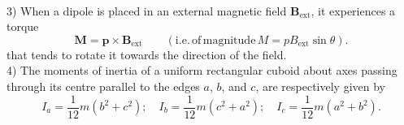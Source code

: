 \documentclass[../TST.tex]{subfiles}
\begin{document}
\begin{eproblem}{\ \\[5pt]}
3) When a dipole is placed in an external magnetic field $\mathbf{B_\mathrm{ext}}$, it experiences a torque
\begin{equation*}
	\mathbf{M}=\mathbf{p}\times\mathbf{B_\mathrm{ext}} \quad\quad (\mathrm{i.e.\,of\,magnitude}\,M=pB_\mathrm{ext}\sin{\theta})
.
\end{equation*}
that tends to rotate it towards the direction of the field.\\

4) The moments of inertia of a uniform rectangular cuboid about axes passing through its centre parallel to the edges $a$, $b$, and $c$, are respectively given by
\begin{equation*}
I_a=\frac{1}{12}m(b^2+c^2); \quad I_b=\frac{1}{12}m(c^2+a^2); \quad I_c=\frac{1}{12}m(a^2+b^2)
.
\end{equation*}
\end{eproblem}
\vspace{3ex}
\end{document}
